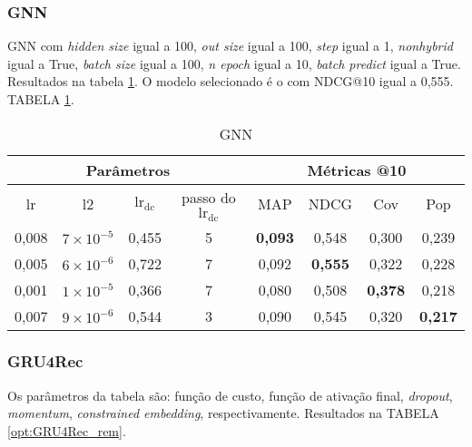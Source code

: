 \subsubsection{GNN}
GNN com \textit{hidden size} igual a 100, \textit{out size} igual a 100,
\textit{step} igual a 1, \textit{nonhybrid} igual a True, \textit{batch size}
igual a 100, \textit{n epoch} igual a 10, \textit{batch predict} igual a True.
Resultados na tabela \ref{opt:GNN_rem}. O modelo selecionado é o com NDCG@10
igual a 0,555. TABELA \ref{opt:GNN_rem}.

\begin{table}[htbp]
  \centering
  \begin{tabular}{|c|c|c|c|c|c|c|c|}
    \hline
      \multicolumn{4}{|c|}{Parâmetros} & \multicolumn{4}{c|}{Métricas @10} \\
      \hline
      lr & l2 & $\text{lr}_\text{dc}$ &passo do $\text{lr}_\text{dc}$ & MAP & NDCG & Cov & Pop \\
      \hline
      0,008 & $7 \times 10^{-5}$ & 0,455 & 5 & \textbf{0,093} & 0,548 & 0,300 & 0,239 \\
      \hline
      0,005 & $6 \times 10^{-6}$ & 0,722 & 7 & 0,092 & \textbf{0,555} & 0,322 & 0,228 \\
      \hline
      0,001 & $1 \times 10^{-5}$ & 0,366 & 7 & 0,080 & 0,508 & \textbf{0,378} & 0,218 \\
      \hline
      0,007 & $9 \times 10^{-6}$ & 0,544 & 3 & 0,090 & 0,545 & 0,320 & \textbf{0,217} \\
      \hline
\end{tabular}
      \caption{GNN}
      \label{opt:GNN_rem}
\end{table}

\subsubsection{GRU4Rec}

Os parâmetros da tabela são: função de custo, função de ativação final,
\textit{dropout}, \textit{momentum}, \textit{constrained embedding}, respectivamente.
Resultados na TABELA \ref{opt:GRU4Rec_rem}.

